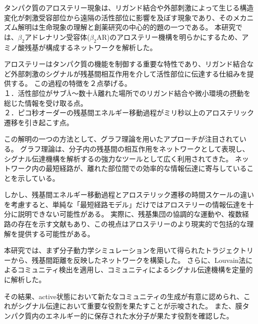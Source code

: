 タンパク質のアロステリー現象は、リガンド結合や外部刺激によって生じる構造変化が刺激受容部位から遠隔の活性部位に影響を及ぼす現象であり、そのメカニズム解明は生命現象の理解と創薬研究の中心的的題の一つである。
本研究では、$\beta_2$アドレナリン受容体($\beta_2$AR)のアロステリー機構を明らかにするため、アミノ酸残基が構成するネットワークを解析した。

アロステリーはタンパク質の機能を制御する重要な特性であり、リガンド結合など外部刺激のシグナルが残基間相互作用を介して活性部位に伝達する仕組みを提供する。
この過程の特徴を２点挙げる。\\
１．活性部位がサブÅ～数十Å離れた場所でのリガンド結合や微小環境の摂動を総じた情報を受け取る点。\\
２．ピコ秒オーダーの残基間エネルギー移動過程がミリ秒以上のアロステリック遷移を引き起こす点。

この解明の一つの方法として、グラフ理論を用いたアプローチが注目されている。
グラフ理論は、分子内の残基間の相互作用をネットワークとして表現し、シグナル伝達機構を解析するの強力なツールとして広く利用されてきた。
ネットワーク内の最短経路が、離れた部位間での効率的な情報伝達に寄与していることを示している。

しかし、残基間エネルギー移動過程とアロステリック遷移の時間スケールの違いを考慮すると、単純な「最短経路モデル」だけではアロステリーの情報伝達を十分に説明できない可能性がある。
実際に、残基集団の協調的な運動や、複数経路の存在を示す文献もあり、この視点はアロステリーのより現実的で包括的な理解を提供する可能性がある。

本研究では、まず分子動力学シミュレーションを用いて得られたトラジェクトリーから、残基間距離を反映したネットワークを構築した。
さらに、Louvain法によるコミュニティ検出を適用し、コミュニティによるシグナル伝達機構を定量的に解析した。

その結果、active状態において新たなコミュニティの生成が有意に認められ、これがシグナル伝達において重要な役割を果たすことが示唆された。
また、膜タンパク質内のエネルギー的に保存された水分子が果たす役割を確認した。
